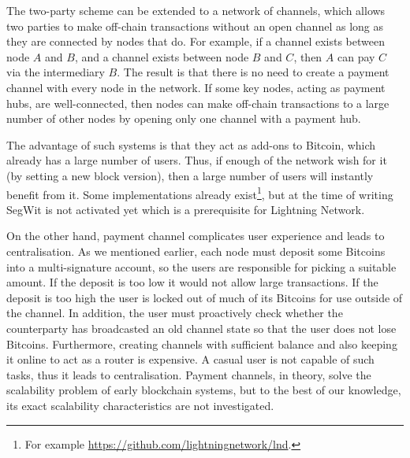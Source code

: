 The two-party scheme can be extended to a network of channels,
which allows two parties to make off-chain transactions without an open channel as long as they are connected by nodes that do.
For example, if a channel exists between node $A$ and $B$, and a channel exists between node $B$ and $C$,
then $A$ can pay $C$ via the intermediary $B$.
The result is that there is no need to create a payment channel with every node in the network.
If some key nodes, acting as payment hubs, are well-connected,
then nodes can make off-chain transactions to a large number of other nodes by opening only one channel with a payment hub.

The advantage of such systems is that they act as add-ons to Bitcoin, which already has a large number of users.
Thus, if enough of the network wish for it (by setting a new block version),
then a large number of users will instantly benefit from it.
Some implementations already exist\footnote{For example \url{https://github.com/lightningnetwork/lnd}.},
but at the time of writing SegWit is not activated yet which is a prerequisite for Lightning Network.

On the other hand, payment channel complicates user experience and leads to centralisation.
As we mentioned earlier, each node must deposit some Bitcoins into a multi-signature account,
so the users are responsible for picking a suitable amount.
If the deposit is too low it would not allow large transactions.
If the deposit is too high the user is locked out of much of its Bitcoins for use outside of the channel.
In addition, the user must proactively check whether the counterparty has broadcasted an old channel state so that the user does not lose Bitcoins.
Furthermore, creating channels with sufficient balance and also keeping it online to act as a router is expensive.
A casual user is not capable of such tasks, thus it leads to centralisation.
Payment channels, in theory, solve the scalability problem of early blockchain systems,
but to the best of our knowledge, its exact scalability characteristics are not investigated.




